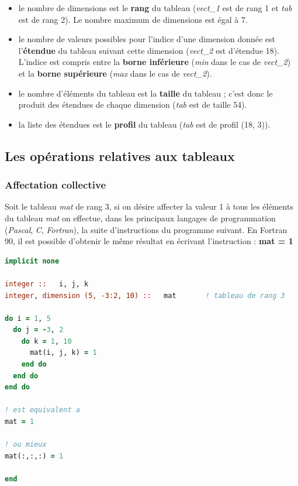 \documentclass[a4paper,twoside]{article}
\begin{document}
\begin{itemize}
\item  le nombre de dimensions est le \textbf{rang} du tableau (\emph{vect\_1} est de rang 1 et \emph{tab} est de rang 2). Le nombre maximum de dimensions est égal à 7.

\item  le nombre de valeurs possibles pour l'indice d'une dimension donnée est l'\textbf{étendue} du tableau suivant cette dimension (\emph{vect\_2} est d'étendue 18). L'indice est compris entre la \textbf{borne inférieure} (\emph{min} dans le cas de \emph{vect\_2}) et la \textbf{borne supérieure} (\emph{max} dans le cas de \emph{vect\_2}).

\item  le nombre d'éléments du tableau est la \textbf{taille} du tableau ; c'est donc le produit des étendues de chaque dimension (\emph{tab} est de taille 54).

\item  la liste des étendues est le \textbf{profil} du tableau (\emph{tab} est de profil (18, 3)).
\end{itemize}

\subsection{Les opérations relatives aux tableaux}

\subsubsection{Affectation collective}

Soit le tableau \emph{mat} de rang 3, si on désire affecter la valeur 1 à tous les éléments du tableau \emph{mat} on effectue, dans les principaux langages de programmation (\emph{Pascal}, \emph{C}, \emph{Fortran}), la suite d'instructions du programme suivant. En Fortran 90, il est possible d'obtenir le même résultat en écrivant l'instruction : \textbf{mat = 1}


\begin{lstlisting}[language=Fortran]
implicit none 
  
integer ::   i, j, k       
integer, dimension (5, -3:2, 10) ::   mat       ! tableau de rang 3 

do i = 1, 5 
  do j = -3, 2 
    do k = 1, 10 
      mat(i, j, k) = 1 
    end do 
  end do 
end do 

! est equivalent a 
mat = 1

! ou mieux
mat(:,:,:) = 1

end
\end{lstlisting}
\end{document}
